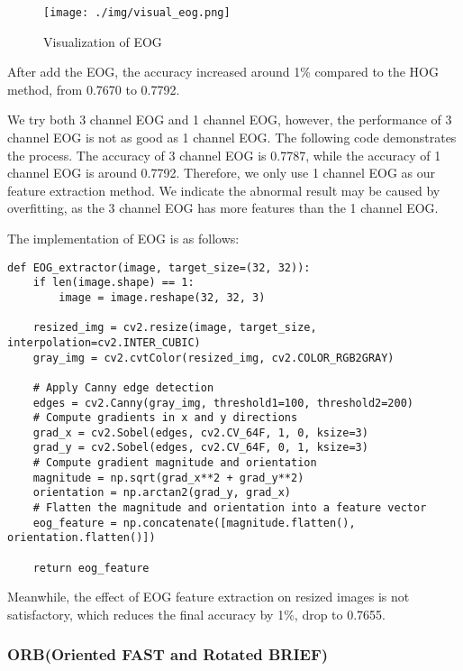 \documentclass[a4paper,11pt]{article}
\begin{document}
\begin{figure}[H]
    \centering
    \texttt{[image: ./img/visual\_eog.png]}
    \caption[visual_hog] {Visualization of EOG}
\end{figure}

After add the EOG, the accuracy increased around 1\% compared to the HOG method, from 0.7670 to 0.7792.

We try both 3 channel EOG and 1 channel EOG, however, the performance of 3 channel EOG is not as good as 1 channel EOG. The following code demonstrates the process.
The accuracy of 3 channel EOG is 0.7787, while the accuracy of 1 channel EOG is around 0.7792.
Therefore, we only use 1 channel EOG as our feature extraction method. We indicate the abnormal result may be caused by overfitting, as the 3 channel EOG has more features than the 1 channel EOG.

The implementation of EOG is as follows:

\begin{verbatim}
def EOG_extractor(image, target_size=(32, 32)):
    if len(image.shape) == 1:
        image = image.reshape(32, 32, 3)
        
    resized_img = cv2.resize(image, target_size, interpolation=cv2.INTER_CUBIC)
    gray_img = cv2.cvtColor(resized_img, cv2.COLOR_RGB2GRAY)

    # Apply Canny edge detection
    edges = cv2.Canny(gray_img, threshold1=100, threshold2=200)
    # Compute gradients in x and y directions
    grad_x = cv2.Sobel(edges, cv2.CV_64F, 1, 0, ksize=3)
    grad_y = cv2.Sobel(edges, cv2.CV_64F, 0, 1, ksize=3)
    # Compute gradient magnitude and orientation
    magnitude = np.sqrt(grad_x**2 + grad_y**2)
    orientation = np.arctan2(grad_y, grad_x)
    # Flatten the magnitude and orientation into a feature vector
    eog_feature = np.concatenate([magnitude.flatten(), orientation.flatten()])

    return eog_feature
\end{verbatim}

Meanwhile, the effect of EOG feature extraction on resized images is not satisfactory, which reduces the final accuracy by 1\%, drop to 0.7655. 

\subsubsection{ORB(Oriented FAST and Rotated BRIEF)}
\end{document}
